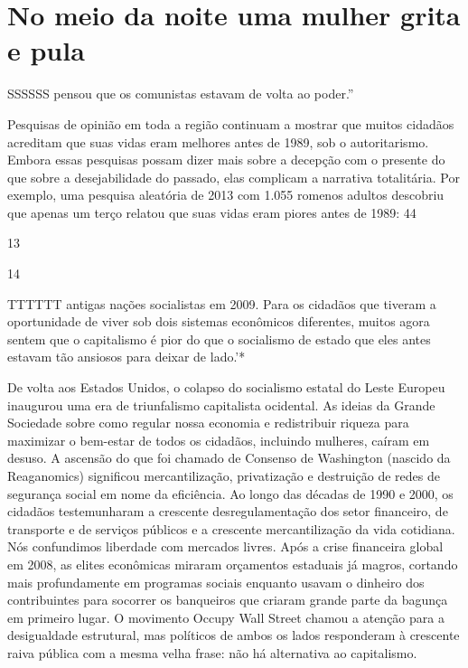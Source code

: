 \section{No meio da noite uma mulher grita e pula}
 \par 
SSSSSS pensou que os comunistas estavam de volta ao poder.”
 \par 
Pesquisas de opinião em toda a região continuam a mostrar que muitos cidadãos acreditam que suas vidas eram melhores antes de 1989, sob o autoritarismo. Embora essas pesquisas possam dizer mais sobre a decepção com o presente do que sobre a desejabilidade do passado, elas complicam a narrativa totalitária. Por exemplo, uma pesquisa aleatória de 2013 com {\color{blue}1}.{\color{blue}055} romenos adultos descobriu que apenas um terço relatou que suas vidas eram piores antes de 1989: 44%
 \par 
13
 \par 
14
 \par 
TTTTTT antigas nações socialistas em 2009. Para os cidadãos que tiveram a oportunidade de viver sob dois sistemas econômicos diferentes, muitos agora sentem que o capitalismo é pior do que o socialismo de estado que eles antes estavam tão ansiosos para deixar de lado.’*
 \par 
De volta aos Estados Unidos, o colapso do socialismo estatal do Leste Europeu inaugurou uma era de triunfalismo capitalista ocidental. As ideias da Grande Sociedade sobre como regular nossa economia e redistribuir riqueza para maximizar o bem-estar de todos os cidadãos, incluindo mulheres, caíram em desuso. A ascensão do que foi chamado de Consenso de Washington (nascido da Reaganomics) significou mercantilização, privatização e destruição de redes de segurança social em nome da eficiência. Ao longo das décadas de 1990 e 2000, os cidadãos testemunharam a crescente desregulamentação dos setor financeiro, de transporte e de serviços públicos e a crescente mercantilização da vida cotidiana. Nós confundimos liberdade com mercados livres. Após a crise financeira global em 2008, as elites econômicas miraram orçamentos estaduais já magros, cortando mais profundamente em programas sociais enquanto usavam o dinheiro dos contribuintes para socorrer os banqueiros que criaram grande parte da bagunça em primeiro lugar. O movimento Occupy Wall Street chamou a atenção para a desigualdade estrutural, mas políticos de ambos os lados responderam à crescente raiva pública com a mesma velha frase: não há alternativa ao capitalismo.
